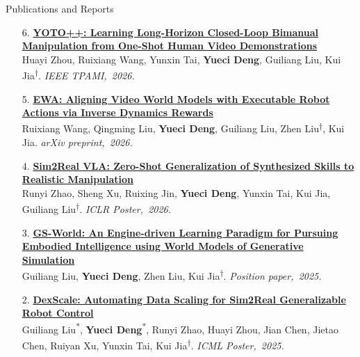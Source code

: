 \begin{rSection}{Publications and Reports}
{\begin{itemize}[leftmargin=1.8em,labelsep=0.5em,itemsep=5pt,topsep=1pt,parsep=0pt]
{\color{cvMuted}Sheng Xu, Ruixing Jin, Huayi Zhou, Bo Yue, Guanren Qiao, Yunxin Tai, \textbf{Yueci Deng}, Kui Jia, Guiliang Liu\textsuperscript{$\dagger$}.} \textit{RSS,~2026.}
\item[{\scriptsize\color{cvMuted}6.}] \href{https://ieeexplore.ieee.org/document/11495283/}{\textbf{YOTO++: Learning Long-Horizon Closed-Loop Bimanual Manipulation from One-Shot Human Video Demonstrations}}\\[-1pt]
{\color{cvMuted}Huayi Zhou, Ruixiang Wang, Yunxin Tai, \textbf{Yueci Deng}, Guiliang Liu, Kui Jia\textsuperscript{$\dagger$}.} \textit{IEEE TPAMI,~2026.}
\item[{\scriptsize\color{cvMuted}5.}] \href{https://arxiv.org/pdf/2603.17808}{\textbf{EWA: Aligning Video World Models with Executable Robot Actions via Inverse Dynamics Rewards}}\\[-1pt]
{\color{cvMuted}Ruixiang Wang, Qingming Liu, \textbf{Yueci Deng}, Guiliang Liu, Zhen Liu\textsuperscript{$\dagger$}, Kui Jia.} \textit{arXiv preprint,~2026.}
\item[{\scriptsize\color{cvMuted}4.}] \href{https://openreview.net/pdf?id=H4SyKHjd4c}{\textbf{Sim2Real VLA: Zero-Shot Generalization of Synthesized Skills to Realistic Manipulation}}\\[-1pt]
{\color{cvMuted}Runyi Zhao, Sheng Xu, Ruixing Jin, \textbf{Yueci Deng}, Yunxin Tai, Kui Jia, Guiliang Liu\textsuperscript{$\dagger$}.} \textit{ICLR Poster,~2026.}
\item[{\scriptsize\color{cvMuted}3.}] \href{https://www.researchgate.net/profile/Guiliang-Liu-2/publication/396641390\_GS-World\_An\_Efficient\_Engine-driven\_Learning\_Paradigm\_for\_Pursuing\_Embodied\_Intelligence\_using\_World\_Models\_of\_Generative\_Simulation/links/68f33c277d9a4d4e870a9a9d/GS-World-An-Efficient-Engine-driven-Learning-Paradigm-for-Pursuing-Embodied-Intelligence-using-World-Models-of-Generative-Simulation.pdf}{\textbf{GS-World: An Engine-driven Learning Paradigm for Pursuing Embodied Intelligence using World Models of Generative Simulation}}\\[-1pt]
{\color{cvMuted}Guiliang Liu, \textbf{Yueci Deng}, Zhen Liu, Kui Jia\textsuperscript{$\dagger$}.} \textit{Position paper,~2025.}
\item[{\scriptsize\color{cvMuted}2.}] \href{https://openreview.net/pdf?id=AVVXX0erKT}{\textbf{DexScale: Automating Data Scaling for Sim2Real Generalizable Robot Control}}\\[-1pt]
{\color{cvMuted}Guiliang Liu\textsuperscript{*}, \textbf{Yueci Deng}\textsuperscript{*}, Runyi Zhao, Huayi Zhou, Jian Chen, Jietao Chen, Ruiyan Xu, Yunxin Tai, Kui Jia\textsuperscript{$\dagger$}.} \textit{ICML Poster,~2025.}

\end{itemize}}
\end{rSection}
